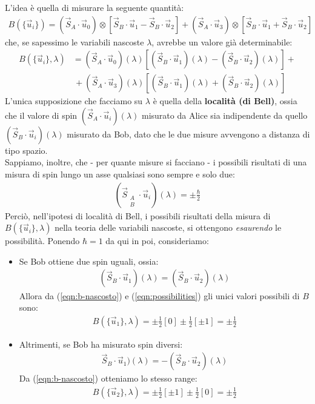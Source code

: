 \documentclass[../../FisicaTeorica.tex]{subfiles}
\begin{document}
L'idea è quella di misurare la seguente quantità:
\begin{align*}
B(\{\vec{u}_i\})=(\vec{S}_A \cdot \vec{u}_0) \otimes [\vec{S}_B \cdot \vec{u}_1 - \vec{S}_B \cdot \vec{u}_2 ] +(\vec{S}_A \cdot \vec{u}_3)  \otimes [\vec{S}_B \cdot \vec{u}_1 + \vec{S}_B \cdot \vec{u}_2]
\end{align*}
che, se sapessimo le variabili nascoste $\lambda$, avrebbe un valore già determinabile:
\begin{align}\nonumber
B(\{\vec{u}_i\},\lambda) &= (\vec{S}_A \cdot \vec{u}_0)(\lambda)[(\vec{S}_B \cdot \vec{u}_1)(\lambda)-(\vec{S}_B \cdot \vec{u}_2)(\lambda)] +\\
&\,+(\vec{S}_A \cdot \vec{u}_3)(\lambda)[(\vec{S}_B\cdot \vec{u}_1)(\lambda) + (\vec{S}_B \cdot \vec{u}_2)(\lambda)]
\label{eqn:b-nascosto}
\end{align}
L'unica supposizione che facciamo su $\lambda$ è quella della \textbf{località (di Bell)}, ossia che il valore di spin $(\vec{S}_A \cdot \vec{u}_i)(\lambda)$ misurato da Alice sia indipendente da quello $(\vec{S}_B\cdot \vec{u}_i)(\lambda)$ misurato da Bob, dato che le due misure avvengono a distanza di tipo spazio.\\
Sappiamo, inoltre, che - per quante misure si facciano - i possibili risultati di una misura di spin lungo un asse qualsiasi sono sempre e solo due:
\begin{align}
\left(\vec{S}_{\substack{A\\B}} \cdot \vec{u} _i\right)(\lambda) = \pm \frac{\hbar}{2}
\label{eqn:possibilities}
\end{align}
Perciò, nell'ipotesi di località di Bell, i possibili risultati della misura di $B(\{\vec{u}_i\},\lambda)$ nella teoria delle variabili nascoste, si ottengono \textit{esaurendo} le possibilità. Ponendo $\hbar = 1$ da qui in poi, consideriamo:
\begin{itemize}
\item Se Bob ottiene due spin uguali, ossia:
\begin{align*}
(\vec{S}_B \cdot \vec{u}_1)(\lambda) = (\vec{S}_B \cdot \vec{u}_2)(\lambda)
\end{align*} 
Allora da (\ref{eqn:b-nascosto}) e (\ref{eqn:possibilities}) gli unici valori possibili di $B$ sono:
\begin{align*}
B(\{\vec{u}_1\},\lambda) = \pm \frac{1}{2}[0] \pm \frac{1}{2}[\pm 1] = \pm \frac{1}{2}
\end{align*}
\item Altrimenti, se Bob ha misurato spin diversi:
\begin{align*}
\vec{S}_B \cdot \vec{u}_1)(\lambda) = -(\vec{S}_B \cdot \vec{u}_2)(\lambda)
\end{align*}
Da (\ref{eqn:b-nascosto}) otteniamo lo stesso range:
\begin{align*}
B(\{\vec{u}_2\}, \lambda) = \pm \frac{1}{2}[\pm 1] \pm \frac{1}{2}[0] = \pm \frac{1}{2}
\end{align*}
\end{itemize}
\end{document}

